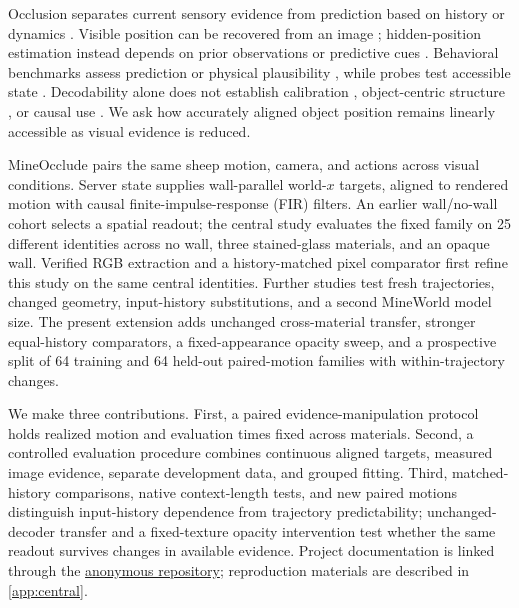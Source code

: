 \documentclass{article}
\begin{document}
Occlusion separates current sensory evidence from prediction based on history or dynamics \citep{riochet2018intphys,weihs2022benchmarking,piloto2022intuitive,garrido2025intuitive,upadhyay2026worldbench}. Visible position can be recovered from an image \citep{chen2023beyond,zhang2026whatdo}; hidden-position estimation instead depends on prior observations or predictive cues \citep{kalman1960new,gordon1993novel,newell2025comotion,shai2024transformers}. Behavioral benchmarks assess prediction or physical plausibility \citep{yi2020clevrer,tung2023physionpp,gu2025geco}, while probes test accessible state \citep{alain2017understanding,li2023emergent,nanda2023emergent,joseph2026interpreting}. Decodability alone does not establish calibration \citep{guo2017calibration,mei2026world}, object-centric structure \citep{battaglia2016interaction,kipf2020contrastive}, or causal use \citep{hewitt2019designing,belinkov2022probing,elazar2021amnesic,geiger2024finding,alam2026causal}. We ask how accurately aligned object position remains linearly accessible as visual evidence is reduced.

MineOcclude pairs the same sheep motion, camera, and actions across visual conditions. Server state supplies wall-parallel world-$x$ targets, aligned to rendered motion with causal finite-impulse-response (FIR) filters. An earlier wall/no-wall cohort selects a spatial readout; the central study evaluates the fixed family on 25 different identities across no wall, three stained-glass materials, and an opaque wall. Verified RGB extraction and a history-matched pixel comparator first refine this study on the same central identities. Further studies test fresh trajectories, changed geometry, input-history substitutions, and a second MineWorld model size. The present extension adds unchanged cross-material transfer, stronger equal-history comparators, a fixed-appearance opacity sweep, and a prospective split of 64 training and 64 held-out paired-motion families with within-trajectory changes.

We make three contributions. First, a paired evidence-manipulation protocol holds realized motion and evaluation times fixed across materials. Second, a controlled evaluation procedure combines continuous aligned targets, measured image evidence, separate development data, and grouped fitting. Third, matched-history comparisons, native context-length tests, and new paired motions distinguish input-history dependence from trajectory predictability; unchanged-decoder transfer and a fixed-texture opacity intervention test whether the same readout survives changes in available evidence. Project documentation is linked through the \href{https://anonymous.4open.science/r/MineOcclude-5503/}{\textcolor{blue!70!black}{anonymous repository}}; reproduction materials are described in \autoref{app:central}.
\end{document}
